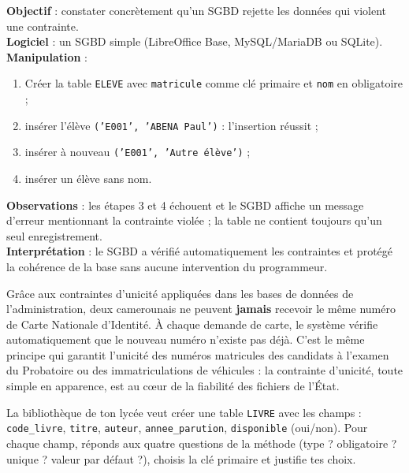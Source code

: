 \documentclass[11pt]{article}
\begin{document}
\begin{experience}
\textbf{Objectif} : constater concrètement qu'un SGBD rejette les données qui violent une contrainte.\\
\textbf{Logiciel} : un SGBD simple (LibreOffice Base, MySQL/MariaDB ou SQLite).\\
\textbf{Manipulation} :
\begin{enumerate}
  \item Créer la table \texttt{ELEVE} avec \texttt{matricule} comme clé primaire et \texttt{nom} en obligatoire ;
  \item insérer l'élève \texttt{('E001', 'ABENA Paul')} : l'insertion réussit ;
  \item insérer à nouveau \texttt{('E001', 'Autre élève')} ;
  \item insérer un élève sans nom.
\end{enumerate}
\textbf{Observations} : les étapes 3 et 4 échouent et le SGBD affiche un message d'erreur mentionnant la contrainte violée ; la table ne contient toujours qu'un seul enregistrement.\\
\textbf{Interprétation} : le SGBD a vérifié automatiquement les contraintes et protégé la cohérence de la base sans aucune intervention du programmeur.
\end{experience}

\begin{savaistu}
Grâce aux contraintes d'unicité appliquées dans les bases de données de l'administration, deux camerounais ne peuvent \textbf{jamais} recevoir le même numéro de Carte Nationale d'Identité. À chaque demande de carte, le système vérifie automatiquement que le nouveau numéro n'existe pas déjà. C'est le même principe qui garantit l'unicité des numéros matricules des candidats à l'examen du Probatoire ou des immatriculations de véhicules : la contrainte d'unicité, toute simple en apparence, est au cœur de la fiabilité des fichiers de l'État.
\end{savaistu}

\begin{exercice}
La bibliothèque de ton lycée veut créer une table \texttt{LIVRE} avec les champs : \texttt{code\_livre}, \texttt{titre}, \texttt{auteur}, \texttt{annee\_parution}, \texttt{disponible} (oui/non). Pour chaque champ, réponds aux quatre questions de la méthode (type ? obligatoire ? unique ? valeur par défaut ?), choisis la clé primaire et justifie tes choix.
\end{exercice}
\end{document}
